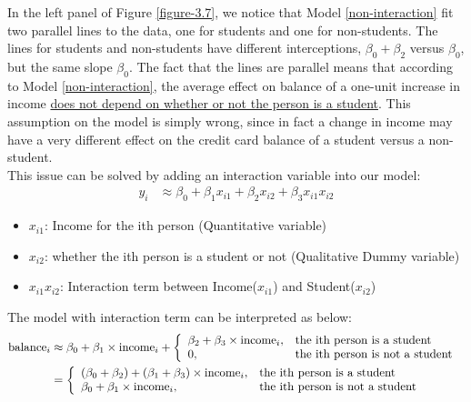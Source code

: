     \documentclass[12pt,fleqn,a4paper]{article}%
\theoremstyle{definition}
\theoremstyle{plain}
\numberwithin{equation}{section}
\begin{document}
In the left panel of Figure \ref{figure-3.7}, we notice that Model \eqref{non-interaction} fit two parallel lines to the data, one for students and one for non-students.
The lines for students and non-students have different interceptions, $\beta_{0}+\beta_{2}$ versus $\beta_{0}$, but the same slope $\beta_{0}$. 
The fact that the lines are parallel means that according to Model \eqref{non-interaction}, the average effect on balance of a one-unit increase in income \underline{does not depend on whether or not the person is a student}. This assumption on the model is simply wrong, since in fact a change in income may have a very different effect on the credit card balance of a student versus a non-student. \\

This issue can be solved by adding an interaction variable into our model:
\begin{align}
y_{i} & \approx \beta_{0}+ \beta_{1} x_{i1} + \beta_{2} x_{i2} + \beta_{3} x_{i1} x_{i2}
\end{align}

\begin{itemize}
\item $x_{i1}$: Income for the ith person (Quantitative variable)
\item $x_{i2}$: whether the ith person is a student or not (Qualitative Dummy variable)
\item $x_{i1} x_{i2}$: Interaction term between Income($x_{i1}$) and Student($x_{i2}$)
\end{itemize}
The model with interaction term can be interpreted as below:
\begin{align}
{\rm balance}_{i} & \approx \beta_{0}+ \beta_{1} \times {\rm income}_{i} + \left\{
		\begin{array}{ll}
			\beta_{2}+ \beta_{3} \times {\rm income}_{i} , & \mbox{the ith person is a student}\\
			0, & \mbox{the ith person is not a student }\\
		\end{array} \right. \\
& = 	 \left\{
		\begin{array}{ll}
			(\beta_{0} + \beta_{2})+(\beta_{1} + \beta_{3}) \times {\rm income}_{i} , & \mbox{the ith person is a student}\\
			\beta_{0}+ \beta_{1} \times {\rm income}_{i}, & \mbox{the ith person is not a student }\\
		\end{array} \right.
\label{interaction}
\end{align}
\end{document}
